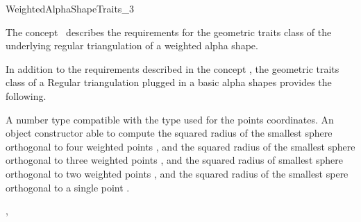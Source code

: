 

\begin{ccRefConcept}{WeightedAlphaShapeTraits_3}


\ccDefinition
  
The concept \ccRefName\ describes the requirements 
for the geometric traits class
of  the underlying  regular triangulation of a weighted alpha shape.

\ccRefines
{}

In addition to the requirements described in the concept 
,
the geometric traits class of a
Regular triangulation plugged in a basic alpha shapes
provides the following.

\ccTypes


 {A number type compatible with the type used for
  the points coordinates.}
{An object constructor able to compute the squared radius of the
 smallest sphere  orthogonal to  four weighted points ,
and the squared radius of the
smallest sphere  orthogonal to  three  weighted points ,
and the squared radius of smallest  sphere orthogonal to 
two weighted points ,
and the  squared radius  of the smallest spere orthogonal to a single
point .} 

\ccCreation
{}  %


\ccAccessFunctions
{} {}


\ccHasModels

,

\end{ccRefConcept}


